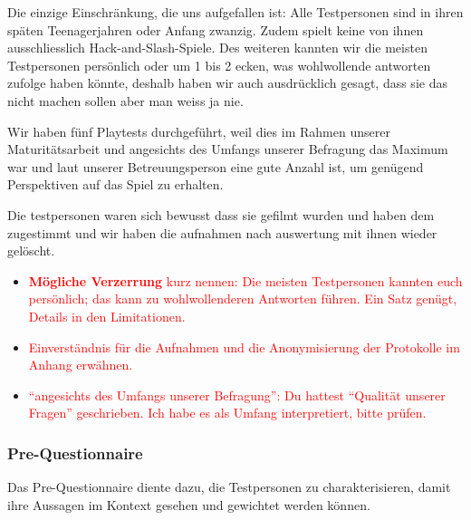 \documentclass[../Main.tex]{subfiles}
\begin{document}
Die einzige Einschränkung, die uns aufgefallen ist: Alle Testpersonen sind in ihren späten Teenagerjahren oder Anfang zwanzig. Zudem spielt keine von ihnen ausschliesslich Hack-and-Slash-Spiele. Des weiteren kannten wir die meisten Testpersonen persönlich oder um 1 bis 2 ecken, was wohlwollende antworten zufolge haben könnte, deshalb haben wir auch ausdrücklich gesagt, dass sie das nicht machen sollen aber man weiss ja nie.

Wir haben fünf Playtests durchgeführt, weil dies im Rahmen unserer Maturitätsarbeit und angesichts des Umfangs unserer Befragung das Maximum war und laut unserer Betreuungsperson eine gute Anzahl ist, um genügend Perspektiven auf das Spiel zu erhalten.

Die testpersonen waren sich bewusst dass sie gefilmt wurden und haben dem zugestimmt und wir haben die aufnahmen nach auswertung mit ihnen wieder gelöscht.

\begin{itemize}[leftmargin=1.5cm]
    \item \textcolor{red}{\textbf{Mögliche Verzerrung} kurz nennen: Die meisten Testpersonen kannten euch persönlich; das kann zu wohlwollenderen Antworten führen. Ein Satz genügt, Details in den Limitationen.}
    \item \textcolor{red}{Einverständnis für die Aufnahmen und die Anonymisierung der Protokolle im Anhang erwähnen.}
    \item \textcolor{red}{\enquote{angesichts des Umfangs unserer Befragung}: Du hattest \enquote{Qualität unserer Fragen} geschrieben. Ich habe es als Umfang interpretiert, bitte prüfen.}
\end{itemize}

\subsubsection{Pre-Questionnaire} \label{sec:PreQuestionnaire}

Das Pre-Questionnaire diente dazu, die Testpersonen zu charakterisieren, damit ihre Aussagen im Kontext gesehen und gewichtet werden können.
\end{document}
